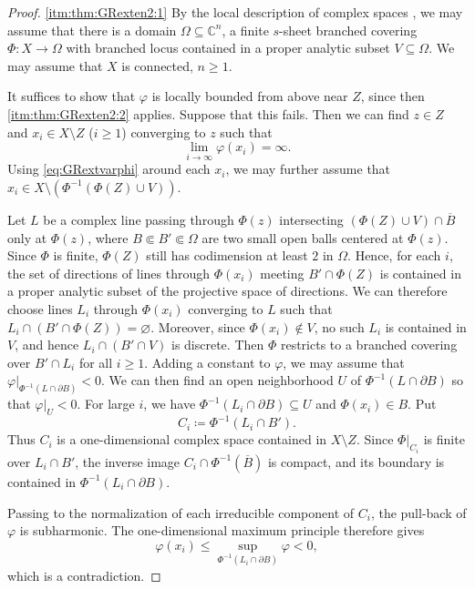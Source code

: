 \begin{proof}
     \ref{itm:thm:GRexten2:1} By the local description of complex spaces \cite[Section~3.4]{CAS}, we may assume that there is a domain $\Omega\subseteq \mathbb{C}^n$, a finite $s$-sheet branched covering $\Phi\colon X\rightarrow \Omega$ with branched locus contained in a proper analytic subset $V\subseteq \Omega$. We may assume that $X$ is connected, $n\geq 1$.

     It suffices to show that $\varphi$ is locally bounded from above near $Z$, since then \ref{itm:thm:GRexten2:2} applies. Suppose that this fails. Then we can find $z\in Z$ and $x_i\in X\setminus Z$ ($i\geq 1$) converging to $z$ such that
     \[
     \lim_{i\to\infty} \varphi(x_i)=\infty.
     \]
    Using \eqref{eq:GRextvarphi} around each $x_i$, we may further assume that $x_i\in X\setminus (\Phi^{-1}(\Phi(Z)\cup V))$.

     Let $L$ be a complex line passing through $\Phi(z)$ intersecting $(\Phi(Z)\cup V)\cap \overline{B}$ only at $\Phi(z)$, where $B\Subset B'\Subset \Omega$ are two small open balls centered at $\Phi(z)$. Since $\Phi$ is finite, $\Phi(Z)$ still has codimension at least $2$ in $\Omega$. Hence, for each $i$, the set of directions of lines through $\Phi(x_i)$ meeting $B'\cap \Phi(Z)$ is contained in a proper analytic subset of the projective space of directions. We can therefore choose lines $L_i$ through $\Phi(x_i)$ converging to $L$ such that $L_i\cap (B'\cap \Phi(Z))=\varnothing$. Moreover, since $\Phi(x_i)\notin V$, no such $L_i$ is contained in $V$, and hence $L_i\cap (B'\cap V)$ is discrete.
     Then $\Phi$ restricts to a branched covering over $B'\cap L_i$ for all $i\geq 1$.
     Adding a constant to $\varphi$, we may assume that $\varphi|_{\Phi^{-1}(L\cap \partial B)}<0$. We can then find an open neighborhood $U$ of $\Phi^{-1}(L\cap \partial B)$ so that $\varphi|_U<0$. For large $i$, we have $\Phi^{-1}(L_i\cap \partial B)\subseteq U$ and $\Phi(x_i)\in B$. Put
    \[
        C_i\coloneqq \Phi^{-1}(L_i\cap B').
    \]
    Thus $C_i$ is a one-dimensional complex space contained in $X\setminus Z$. Since $\Phi|_{C_i}$ is finite over $L_i\cap B'$, the inverse image $C_i\cap\Phi^{-1}(\overline B)$ is compact, and its boundary is contained in $\Phi^{-1}(L_i\cap\partial B)$.

    Passing to the normalization of each irreducible component of $C_i$, the pull-back of $\varphi$ is subharmonic. The one-dimensional maximum principle therefore gives
    \[
        \varphi(x_i)\leq \sup_{\Phi^{-1}(L_i\cap \partial B)}\varphi<0,
    \]
    which is a contradiction.
\end{proof}

